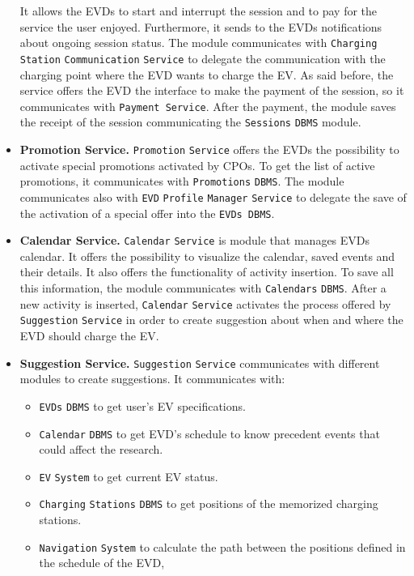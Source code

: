 \begin{itemize}
    It allows the EVDs to start and interrupt the session and to pay for the service the user enjoyed.
    Furthermore, it sends to the EVDs notifications about ongoing session status.
    The module communicates with \verb|Charging| \verb|Station| \verb|Communication| \verb|Service| to delegate the communication with the charging point
    where the EVD wants to charge the EV\@.
    As said before, the service offers the EVD the interface to make the payment of the session, so it communicates with
    \verb|Payment Service|.
    After the payment, the module saves the receipt of the session communicating the \verb|Sessions| \verb|DBMS| module.
    \item \textbf{Promotion Service.} \verb|Promotion| \verb|Service| offers the EVDs the possibility to activate special promotions
    activated by CPOs.
    To get the list of active promotions, it communicates with \verb|Promotions| \verb|DBMS|.
    The module communicates also with \verb|EVD| \verb|Profile| \verb|Manager| \verb|Service| to delegate the save of the activation of a special offer into
    the \verb|EVDs DBMS|.
    \item \textbf{Calendar Service.} \verb|Calendar| \verb|Service| is module that manages EVDs calendar.
    It offers the possibility to visualize the calendar, saved events and their details.
    It also offers the functionality of activity insertion.
    To save all this information, the module communicates with \verb|Calendars| \verb|DBMS|.
    After a new activity is inserted, \verb|Calendar| \verb|Service| activates the process offered by \verb|Suggestion| \verb|Service|
    in order to create suggestion about when and where the EVD should charge the EV\@.
    \item \textbf{Suggestion Service.} \verb|Suggestion| \verb|Service| communicates with different modules to create suggestions.
    It communicates with:
    \begin{itemize}
        \item \verb|EVDs| \verb|DBMS| to get user's EV specifications.
        \item \verb|Calendar| \verb|DBMS| to get EVD's schedule to know precedent events that could affect the research.
        \item \verb|EV| \verb|System| to get current EV status.
        \item \verb|Charging| \verb|Stations| \verb|DBMS| to get positions of the memorized charging stations.
        \item \verb|Navigation| \verb|System| to calculate the path between the positions defined in the schedule of the EVD,

\end{itemize}
\end{itemize}

